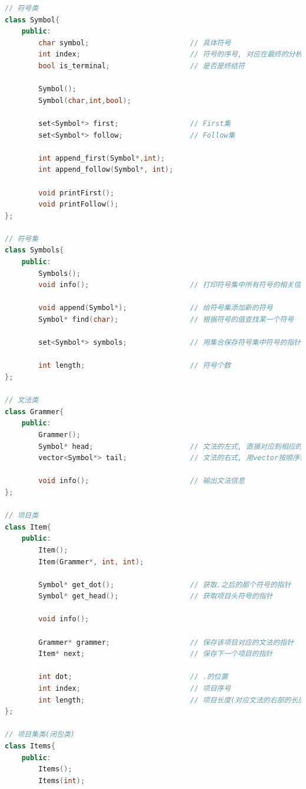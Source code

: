 \documentclass{zpt}
\begin{document}
    \begin{lstlisting}[language=c++]
// 符号类
class Symbol{
    public:
        char symbol;                        // 具体符号
        int index;                          // 符号的序号, 对应在最终的分析表中的行号/列号
        bool is_terminal;                   // 是否是终结符

        Symbol();
        Symbol(char,int,bool);

        set<Symbol*> first;                 // First集
        set<Symbol*> follow;                // Follow集

        int append_first(Symbol*,int);
        int append_follow(Symbol*, int);

        void printFirst();
        void printFollow();
};

// 符号集
class Symbols{
    public:
        Symbols();
        void info();                        // 打印符号集中所有符号的相关信息

        void append(Symbol*);               // 给符号集添加新的符号
        Symbol* find(char);                 // 根据符号的值查找某一个符号

        set<Symbol*> symbols;               // 用集合保存符号集中符号的指针

        int length;                         // 符号个数
};

// 文法类
class Grammer{
    public:
        Grammer();
        Symbol* head;                       // 文法的左式, 直接对应到相应的符号
        vector<Symbol*> tail;               // 文法的右式, 用vector按顺序保存右端的所有符号

        void info();                        // 输出文法信息
};

// 项目类
class Item{
    public:
        Item();
        Item(Grammer*, int, int);

        Symbol* get_dot();                  // 获取.之后的那个符号的指针
        Symbol* get_head();                 // 获取项目头符号的指针

        void info();

        Grammer* grammer;                   // 保存该项目对应的文法的指针
        Item* next;                         // 保存下一个项目的指针

        int dot;                            // .的位置
        int index;                          // 项目序号
        int length;                         // 项目长度(对应文法的右部的长度)
};

// 项目集类(闭包类)
class Items{
    public:
        Items();
        Items(int);


\end{lstlisting}
\end{document}
